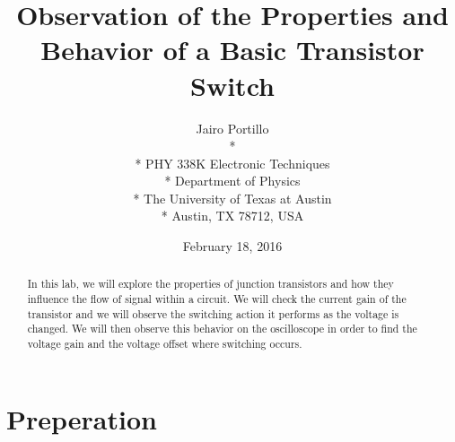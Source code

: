 \documentclass[11pt,letterpaper,onecolumn]{article}
\begin{document}

\title{\bf Observation of the Properties and Behavior of a Basic Transistor Switch}

\author{
 Jairo Portillo \\*
  \\*
 PHY 338K Electronic Techniques \\*
 Department of Physics \\*
 The University of Texas at Austin \\*
 Austin, TX 78712, USA
}
\date{February 18, 2016}


\maketitle


\begin{abstract}

In this lab, we will explore the properties of junction transistors and how they influence the flow of signal within a circuit. We will check the current gain of the transistor and we will observe the switching action it performs as the voltage is changed. We will then observe this behavior on the oscilloscope in order to find the voltage gain and the voltage offset where switching occurs.       

\end{abstract}



\section{Preperation}
\end{document}
